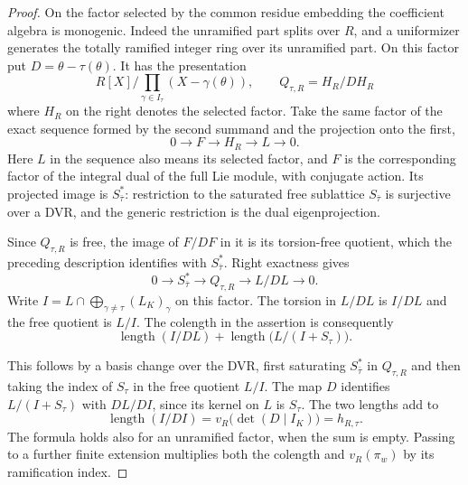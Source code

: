 \begin{proof}
On the factor selected by the common residue embedding the coefficient
algebra is monogenic. Indeed the unramified part splits over \(R\),
and a uniformizer generates the totally ramified integer ring over
its unramified part. On this factor put \(D=\theta-\tau(\theta)\).
It has the presentation
\[
 R[X]\big/\prod_{\gamma\in I_\tau}(X-\gamma(\theta)),\qquad
          Q_{\tau,R}=H_R/DH_R
\]
where \(H_R\) on the right denotes the selected factor. Take the
same factor of the exact sequence formed by the second summand and
the projection onto the first,
\[
         0\longrightarrow F\longrightarrow H_R
                              \longrightarrow L\longrightarrow0 .
\]
Here \(L\) in the sequence also means its selected factor, and
\(F\) is the corresponding factor of the integral dual of the
full Lie module, with conjugate action. Its projected image is
\(S_{\bar\tau}^*\): restriction to the saturated free sublattice
\(S_{\bar\tau}\) is surjective over a DVR, and the generic
restriction is the dual eigenprojection.

Since \(Q_{\tau,R}\) is free, the image of \(F/DF\) in it is its
torsion-free quotient, which the preceding description identifies with
\(S_{\bar\tau}^*\). Right exactness gives
\[
     0\longrightarrow S_{\bar\tau}^*\longrightarrow Q_{\tau,R}
                       \longrightarrow L/DL\longrightarrow0 .
\]
Write \(I=L\cap\bigoplus_{\gamma\ne\tau}(L_K)_\gamma\) on this
factor. The torsion in \(L/DL\) is \(I/DL\) and the free quotient
is \(L/I\). The colength in the assertion is consequently
\[
    \operatorname{length}(I/DL)+
    \operatorname{length}\bigl(L/(I+S_\tau)\bigr).
\]

This follows by a basis change over the DVR, first
saturating \(S_{\bar\tau}^*\) in \(Q_{\tau,R}\) and then taking
the index of \(S_\tau\) in the free quotient \(L/I\).
The map \(D\) identifies \(L/(I+S_\tau)\) with \(DL/DI\),
since its kernel on \(L\) is \(S_\tau\). The two lengths add to
\[
  \operatorname{length}(I/DI)
     =v_R\bigl(\det(D\mid I_K)\bigr)=h_{R,\tau}.
\]
The formula holds also for an unramified factor, when the sum is empty.
Passing to a further finite extension multiplies both the colength
and \(v_R(\pi_w)\) by its ramification index.
\end{proof}

